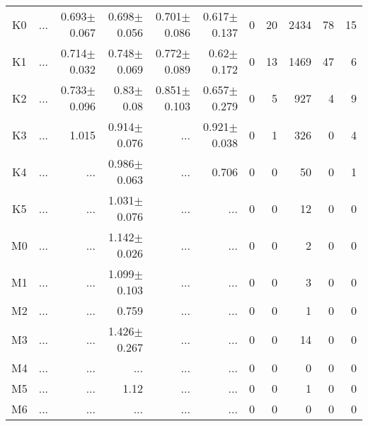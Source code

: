 \begin{table}[t]
\begin{center}
\begin{tabular}{c|rrrrr|rrrrr}
K0	&	 ...	&	0.693$\pm$0.067	&	0.698$\pm$0.056	&	0.701$\pm$0.086	&	0.617$\pm$0.137	&	0	&	20	&	2434	&	78	&	15	\\
K1	&	 ...	&	0.714$\pm$0.032	&	0.748$\pm$0.069	&	0.772$\pm$0.089	&	0.62$\pm$0.172	&	0	&	13	&	1469	&	47	&	6	\\
K2	&	 ...	&	0.733$\pm$0.096	&	0.83$\pm$0.08	&	0.851$\pm$0.103	&	0.657$\pm$0.279	&	0	&	5	&	927	&	4	&	9	\\
K3	&	 ...	&	1.015	&	0.914$\pm$0.076	&	 ...	&	0.921$\pm$0.038	&	0	&	1	&	326	&	0	&	4	\\
K4	&	 ...	&	 ...	&	0.986$\pm$0.063	&	 ...	&	0.706	&	0	&	0	&	50	&	0	&	1	\\
K5	&	 ...	&	 ...	&	1.031$\pm$0.076	&	 ...	&	 ...	&	0	&	0	&	12	&	0	&	0	\\
M0	&	 ...	&	 ...	&	1.142$\pm$0.026	&	 ...	&	 ...	&	0	&	0	&	2	&	0	&	0	\\
M1	&	 ...	&	 ...	&	1.099$\pm$0.103	&	 ...	&	 ...	&	0	&	0	&	3	&	0	&	0	\\
M2	&	 ...	&	 ...	&	0.759	&	 ...	&	 ...	&	0	&	0	&	1	&	0	&	0	\\
M3	&	 ...	&	 ...	&	1.426$\pm$0.267	&	 ...	&	 ...	&	0	&	0	&	14	&	0	&	0	\\
M4	&	 ...	&	 ...	&	 ...	&	 ...	&	 ...	&	0	&	0	&	0	&	0	&	0	\\
M5	&	 ...	&	 ...	&	1.12	&	 ...	&	 ...	&	0	&	0	&	1	&	0	&	0	\\
M6	&	 ...	&	 ...	&	 ...	&	 ...	&	 ...	&	0	&	0	&	0	&	0	&	0	\\
    \bottomrule
    \end{tabular}
\end{center}
\end{table}


